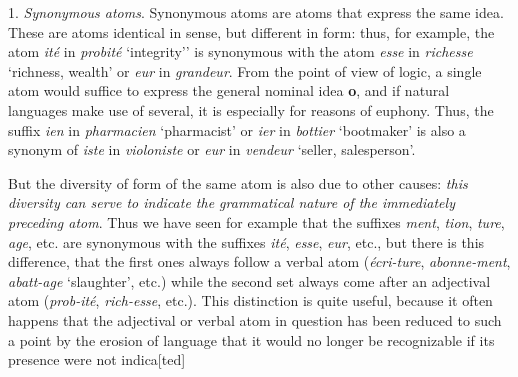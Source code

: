 \begin{sloppypar}
{  {\small 1. \emph{Synonymous atoms}. Synonymous atoms are atoms that
    express the same idea. These are atoms identical in sense, but
    different in form: thus, for example, the atom \emph{ité} in
    \emph{probité} `integrity'' is synonymous with the atom \emph{esse} in
    \emph{richesse} `richness, wealth' or \emph{eur} in \emph{grandeur}. From
    the point of view of logic, a single atom would suffice to express
    the general nominal idea \textbf{o}, and if natural languages make
    use of several, it is especially for reasons of euphony. Thus, the
    suffix \emph{ien} in \emph{pharmacien} `pharmacist' or \emph{ier} in
    \emph{bottier} `bootmaker' is also a synonym of \emph{iste} in
    \emph{violoniste} or \emph{eur} in \emph{vendeur} `seller, salesperson'.

    But the diversity of form of the same atom is also due to other
    causes: \emph{this diversity can serve to indicate the grammatical
      nature of the immediately preceding atom}. Thus we have seen for
    example that the suffixes \emph{ment}, \emph{tion}, \emph{ture}, \emph{age},
    etc. are synonymous with the suffixes \emph{ité}, \emph{esse},
    \emph{eur}, etc., but there is this difference, that the first ones
    always follow a verbal atom (\emph{écri-ture}, \emph{abonne-ment},
    \emph{abatt-age} `slaughter', etc.) while the second set always come
    after an adjectival atom (\emph{prob-ité}, \emph{rich-esse}, etc.).
    This distinction is quite useful, because it often happens that
    the adjectival or verbal atom in question has been reduced to such
    a point by the erosion of language that it would no longer be
    recognizable if its presence were not indica[ted]



  }

}

\end{sloppypar}
